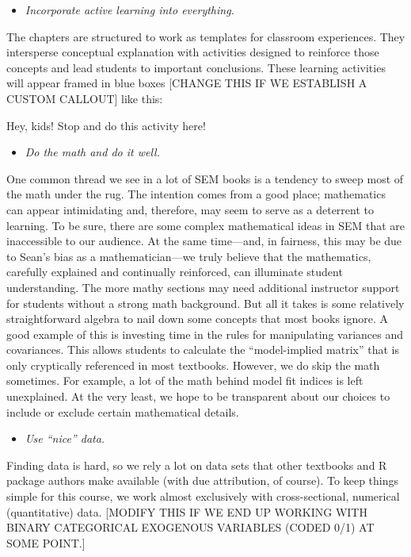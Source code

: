 \documentclass[
]{book}
\providecommand{\tightlist}{%
  \setlength{\itemsep}{0pt}\setlength{\parskip}{0pt}}
\begin{document}
\begin{itemize}
\tightlist
\item
  \emph{Incorporate active learning into everything.}
\end{itemize}

The chapters are structured to work as templates for classroom experiences. They intersperse conceptual explanation with activities designed to reinforce those concepts and lead students to important conclusions. These learning activities will appear framed in blue boxes {[}CHANGE THIS IF WE ESTABLISH A CUSTOM CALLOUT{]} like this:

Hey, kids! Stop and do this activity here!

\begin{itemize}
\tightlist
\item
  \emph{Do the math and do it well.}
\end{itemize}

One common thread we see in a lot of SEM books is a tendency to sweep most of the math under the rug. The intention comes from a good place; mathematics can appear intimidating and, therefore, may seem to serve as a deterrent to learning. To be sure, there are some complex mathematical ideas in SEM that are inaccessible to our audience. At the same time---and, in fairness, this may be due to Sean's bias as a mathematician---we truly believe that the mathematics, carefully explained and continually reinforced, can illuminate student understanding. The more mathy sections may need additional instructor support for students without a strong math background. But all it takes is some relatively straightforward algebra to nail down some concepts that most books ignore. A good example of this is investing time in the rules for manipulating variances and covariances. This allows students to calculate the ``model-implied matrix'' that is only cryptically referenced in most textbooks. However, we do skip the math sometimes. For example, a lot of the math behind model fit indices is left unexplained. At the very least, we hope to be transparent about our choices to include or exclude certain mathematical details.

\begin{itemize}
\tightlist
\item
  \emph{Use ``nice'' data.}
\end{itemize}

Finding data is hard, so we rely a lot on data sets that other textbooks and R package authors make available (with due attribution, of course). To keep things simple for this course, we work almost exclusively with cross-sectional, numerical (quantitative) data. {[}MODIFY THIS IF WE END UP WORKING WITH BINARY CATEGORICAL EXOGENOUS VARIABLES (CODED 0/1) AT SOME POINT.{]}
\end{document}
